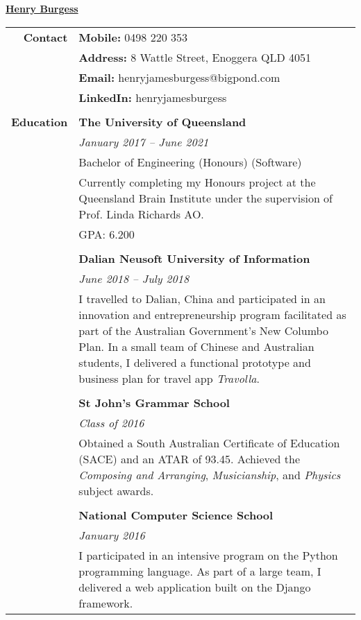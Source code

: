 \documentclass[12pt,twoside,a4paper]{article}
\begin{document}
\begin{center}
	\huge{\underline{\textbf{Henry Burgess}}}
\end{center}

\begin{tabularx}{\textwidth}{r | L}
	\textbf{Contact} 			& 	\textbf{Mobile:}  0498 220 353 \\
										&	\textbf{Address:} 8 Wattle Street, Enoggera QLD 4051 \\
										&	\textbf{Email:} henryjamesburgess@bigpond.com \\
										&	\textbf{LinkedIn:} henryjamesburgess \\
										& \\
	\textbf{Education} 		& \textbf{The University of Queensland} \\
										& \textit{January 2017 – June 2021} \\
										& Bachelor of Engineering (Honours) (Software) \\
										& Currently completing my Honours project at the Queensland Brain Institute under the supervision of Prof. Linda Richards AO. \\
										& GPA: 6.200 \\
										& \\
										& \textbf{Dalian Neusoft University of Information} \\
										& \textit{June 2018 – July 2018} \\
										& I travelled to Dalian, China and participated in an innovation and entrepreneurship program facilitated as part of the Australian Government’s New Columbo Plan. In a small team of Chinese and Australian students, I delivered a functional prototype and business plan for travel app \textit{Travolla}. \\
										& \\
										& \textbf{St John’s Grammar School} \\
										& \textit{Class of 2016} \\
										& Obtained a South Australian Certificate of Education (SACE) and an ATAR of 93.45. Achieved the \textit{Composing and Arranging}, \textit{Musicianship}, and \textit{Physics} subject awards. \\
										& \\
										& \textbf{National Computer Science School} \\
										& \textit{January 2016} \\
										& I participated in an intensive program on the Python programming language. As part of a large team, I delivered a web application built on the Django framework. \\

\end{tabularx}
\end{document}
